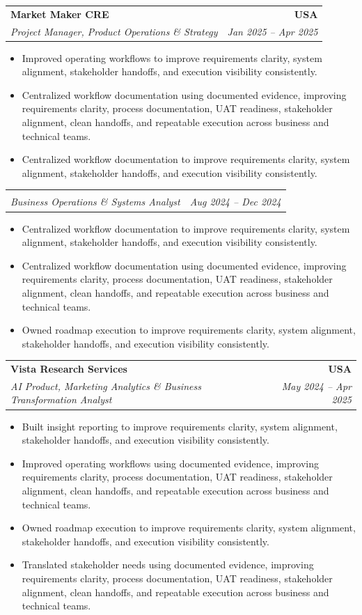 \documentclass[letterpaper,10pt]{article}
\makeatletter
\newcommand{\resumeItem}[1]{\item \small{#1}}
\newcommand{\resumeSubheading}[4]{
  \vspace{1pt}\item
    \begin{tabular*}{1.0\textwidth}[t]{l@{\extracolsep{\fill}}r}
      \textbf{#1} & \textbf{\small #2} \\
      \textit{\small #3} & \textit{\small #4} \\
    \end{tabular*}\vspace{-6pt}
}
\newcommand{\resumeItemListStart}{\begin{itemize}[leftmargin=0.15in, itemsep=1pt, topsep=3pt]}
\newcommand{\resumeItemListEnd}{\end{itemize}\vspace{-2pt}}
\makeatother
\begin{document}
\vspace{-2pt}

\resumeSubheading
{Market Maker CRE}{USA}
{Project Manager, Product Operations \& Strategy}{Jan 2025 -- Apr 2025}
\resumeItemListStart
\resumeItem{Improved operating workflows to improve requirements clarity, system alignment, stakeholder handoffs, and execution visibility consistently.}
\resumeItem{Centralized workflow documentation using documented evidence, improving requirements clarity, process documentation, UAT readiness, stakeholder alignment, clean handoffs, and repeatable execution across business and technical teams.}
\resumeItem{Centralized workflow documentation to improve requirements clarity, system alignment, stakeholder handoffs, and execution visibility consistently.}
\resumeItemListEnd

\vspace{-17pt}

\resumeSubheading
{}{}
{Business Operations \& Systems Analyst}{Aug 2024 -- Dec 2024}
\resumeItemListStart
\resumeItem{Centralized workflow documentation to improve requirements clarity, system alignment, stakeholder handoffs, and execution visibility consistently.}
\resumeItem{Centralized workflow documentation using documented evidence, improving requirements clarity, process documentation, UAT readiness, stakeholder alignment, clean handoffs, and repeatable execution across business and technical teams.}
\resumeItem{Owned roadmap execution to improve requirements clarity, system alignment, stakeholder handoffs, and execution visibility consistently.}
\resumeItemListEnd

\vspace{-2pt}

\resumeSubheading
{Vista Research Services}{USA}
{AI Product, Marketing Analytics \& Business Transformation Analyst}{May 2024 -- Apr 2025}
\resumeItemListStart
\resumeItem{Built insight reporting to improve requirements clarity, system alignment, stakeholder handoffs, and execution visibility consistently.}
\resumeItem{Improved operating workflows using documented evidence, improving requirements clarity, process documentation, UAT readiness, stakeholder alignment, clean handoffs, and repeatable execution across business and technical teams.}
\resumeItem{Owned roadmap execution to improve requirements clarity, system alignment, stakeholder handoffs, and execution visibility consistently.}
\resumeItem{Translated stakeholder needs using documented evidence, improving requirements clarity, process documentation, UAT readiness, stakeholder alignment, clean handoffs, and repeatable execution across business and technical teams.}
\resumeItemListEnd
\end{document}
